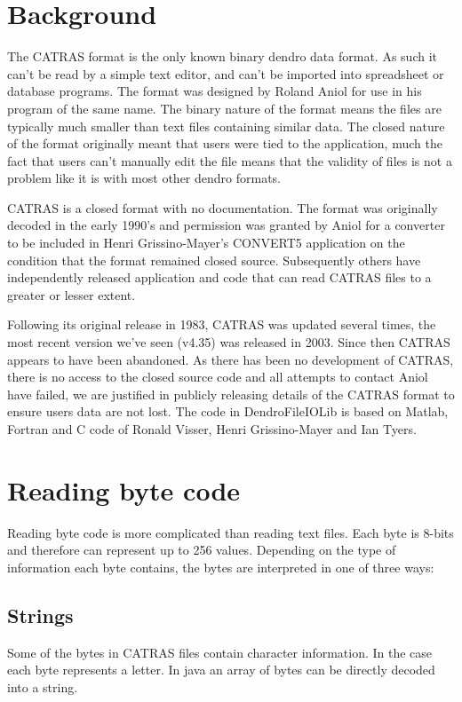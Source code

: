 \section{Background}
The CATRAS format is the only known binary dendro data format. As such it can't be read by a simple text editor, and can't be imported into spreadsheet or database programs. The format was designed by Roland Aniol for use in his program of the same name. The binary nature of the format means the files are typically much smaller than text files containing similar data. The closed nature of the format originally meant that users were tied to the application, much the fact that users can't manually edit the file means that the validity of files is not a problem like it is with most other dendro formats.

CATRAS is a closed format with no documentation. The format was originally decoded in the early 1990's and permission was granted by Aniol for a converter to be included in Henri Grissino-Mayer's CONVERT5 application on the condition that the format remained closed source. Subsequently others have independently released application and code that can read CATRAS files to a greater or lesser extent.

Following its original release in 1983, CATRAS was updated several times, the most recent version we've seen (v4.35) was released in 2003. Since then CATRAS appears to have been abandoned. As there has been no development of CATRAS, there is no access to the closed source code and all attempts to contact Aniol have failed, we are justified in publicly releasing details of the CATRAS format to ensure users data are not lost. The code in DendroFileIOLib is based on Matlab, Fortran and C code of Ronald Visser, Henri Grissino-Mayer and Ian Tyers. 

\section{Reading byte code}

Reading byte code is more complicated than reading text files. Each byte is 8-bits and therefore can represent up to 256 values. Depending on the type of information each byte contains, the bytes are interpreted in one of three ways: 

\subsection{Strings} Some of the bytes in CATRAS files contain character information. In the case each byte represents a letter. In java an array of bytes can be directly decoded into a string. 

